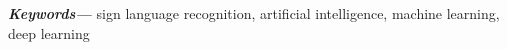 \begin{abstract}
	
\end{abstract}
\providecommand{\keywords}[1]
{
	\small	
	\textbf{\textit{Keywords---}} #1
}
\keywords{sign language recognition, artificial intelligence, machine learning, deep learning}